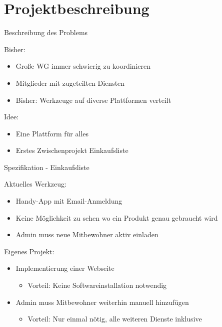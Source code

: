 \section{Projektbeschreibung}
\begin{frame}{Beschreibung des Problems}

Bisher:
\begin{itemize}
\item Große WG immer schwierig zu koordinieren
\item Mitglieder mit zugeteilten Diensten
\item Bisher: Werkzeuge auf diverse Plattformen verteilt
\end{itemize}

Idee:
\begin{itemize}
\item Eine Plattform für alles
\item Erstes Zwischenprojekt \glqq Einkaufsliste\grqq
\end{itemize}

\end{frame}


\begin{frame}{Spezifikation - Einkaufsliste}

Aktuelles Werkzeug:
\begin{itemize}
\item Handy-App mit Email-Anmeldung
\item Keine Möglichkeit zu sehen wo ein Produkt genau gebraucht wird
\item Admin muss neue Mitbewohner aktiv einladen
\end{itemize}


Eigenes Projekt:
\begin{itemize}
\item Implementierung einer Webseite
\begin{itemize}
	\item Vorteil: Keine Softwareinstallation notwendig
\end{itemize}

\item Admin muss Mitbewohner weiterhin manuell hinzufügen
\begin{itemize}
	\item Vorteil: Nur einmal nötig, alle weiteren Dienste inklusive
\end{itemize}

\end{itemize}

\end{frame}
